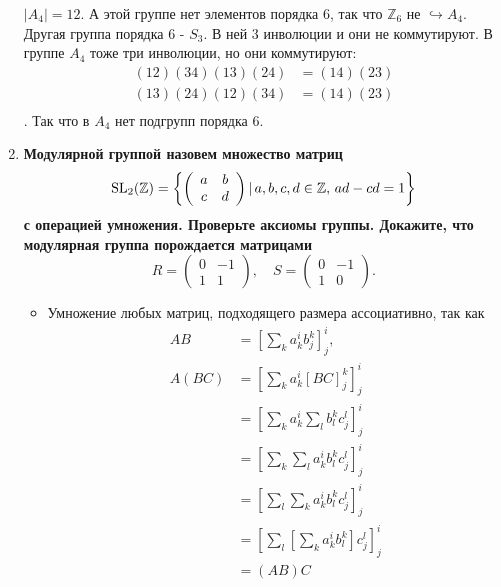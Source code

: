 \documentclass{article}
\begin{document}
\begin{enumerate}
        $|A_4|=12$. А этой группе нет элементов порядка 6, так что
        $\mathbb{Z}_6$ не $\hookrightarrow A_4$. Другая группа порядка 6 -
        $S_3$. В ней 3 инволюции и они не коммутируют. В группе $A_4$ тоже
        три инволюции, но они коммутируют:
        \begin{align*}
            (12)(34)(13)(24)&=(14)(23)\\
            (13)(24)(12)(34)&=(14)(23)\\
        \end{align*}. Так что в $A_4$ нет подгрупп порядка 6.
    \item \textbf{Модулярной группой назовем множество матриц
        \[
            \textnormal{SL}_2(\mathbb{Z}) = \left\{
                \left(\begin{array}{cc} a & b\\ c & d\end{array}\right)
                |\, a,b,c,d\in\mathbb{Z},\,ad-cd=1
            \right\}
        \]
        с операцией умножения. Проверьте аксиомы группы. Докажите, что 
        модулярная группа порождается матрицами
        \[
            R = \left(\begin{array}{cc} 0 & -1\\ 1 & 1\end{array}\right),\quad
            S = \left(\begin{array}{cc} 0 & -1\\ 1 & 0\end{array}\right).
        \]}
        \begin{itemize}
            \item Умножение любых матриц, подходящего размера ассоциативно, так
                как
                \begin{align*}
                    AB&=\left[\sum_ka_k^ib_j^k\right]_j^i,\\
                    A(BC)&=\left[\sum_ka_k^i\left[BC\right]_j^k\right]_j^i\\
                    &=\left[\sum_ka_k^i\sum_lb_l^kc_j^l\right]_j^i\\
                    &=\left[\sum_k\sum_la_k^ib_l^kc_j^l\right]_j^i\\
                    &=\left[\sum_l\sum_ka_k^ib_l^kc_j^l\right]_j^i\\
                    &=\left[\sum_l\left[\sum_ka_k^ib_l^k\right]c_j^l\right]_j^i\\
                    &=\left(AB\right)C
                \end{align*}

\end{itemize}
\end{enumerate}
\end{document}
